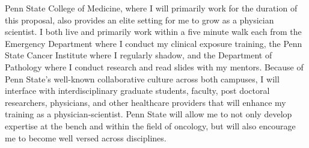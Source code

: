 \documentclass{NIHGrant}
\begin{document}
Penn State College of Medicine, where I will primarily work for the duration of this proposal, also provides an elite setting for me to grow as a physician scientist. I both live and primarily work within a five minute walk each from the Emergency Department where I conduct my clinical exposure training, the Penn State Cancer Institute where I regularly shadow, and the Department of Pathology where I conduct research and read slides with my mentors. Because of Penn State's well-known collaborative culture across both campuses, I will interface with interdisciplinary graduate students, faculty, post doctoral researchers, physicians, and other healthcare providers that will enhance my training as a physician-scientist. Penn State will allow me to not only develop expertise at the bench and within the field of oncology, but will also encourage me to become well versed across disciplines.


\end{document}
